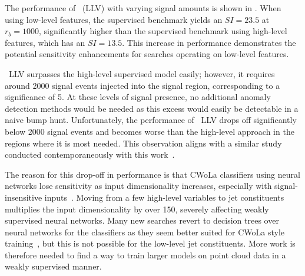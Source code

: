 The performance of \drapes~(LLV) with varying signal amounts is shown in .
When using low-level features, the supervised benchmark yields an $SI=23.5$ at $r_b=1000$, significantly higher than the supervised benchmark using high-level features, which has an $SI=13.5$.
This increase in performance demonstrates the potential sensitivity enhancements for searches operating on low-level features.

\drapes~LLV surpasses the high-level supervised model easily; however, it requires around 2000 signal events injected into the signal region, corresponding to a significance of 5.
At these levels of signal presence, no additional anomaly detection methods would be needed as this excess would easily be detectable in a naive bump hunt.
Unfortunately, the performance of \drapes~LLV drops off significantly below 2000 signal events and becomes worse than the high-level approach in the regions where it is most needed.
This observation aligns with a similar study conducted contemporaneously with this work~\cite{FullPhaseSpace}.

The reason for this drop-off in performance is that CWoLa classifiers using neural networks lose sensitivity as input dimensionality increases, especially with signal-insensitive inputs~\cite{lacathode}.
Moving from a few high-level variables to jet constituents multiplies the input dimensionality by over 150, severely affecting weakly supervised neural networks.
Many new searches revert to decision trees over neural networks for the classifiers as they seem better suited for CWoLa style training~\cite{TreebasedAlgorithmsWeakly, AnomalyDetectionPresence}, but this is not possible for the low-level jet constituents.
More work is therefore needed to find a way to train larger models on point cloud data in a weakly supervised manner.

